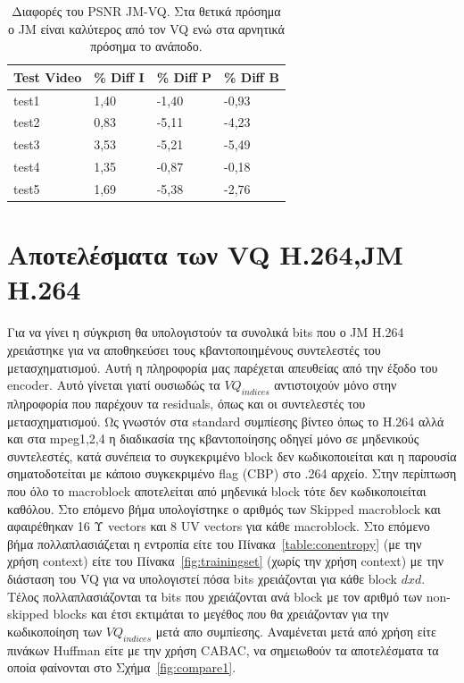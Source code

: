 \begin{table}[h!]
    \begin{center}
        \begin{tabular}{| l | l | l | l |}
        \hline
        Test Video & \% Diff I  & \% Diff P & \% Diff B   \\ \hline
        test1      & 1,40	    & -1,40	    & -0,93       \\ \hline
        test2      & 0,83	    & -5,11	    & -4,23       \\ \hline
        test3      & 3,53	    & -5,21	    & -5,49       \\ \hline
        test4      & 1,35	    & -0,87	    & -0,18       \\ \hline
        test5      & 1,69	    & -5,38	    & -2,76       \\ \hline
        \hline
        \end{tabular}
    \end{center}

    \caption{Διαφορές του PSNR JM-VQ. Στα θετικά πρόσημα ο JM είναι καλύτερος από τον VQ ενώ στα αρνητικά πρόσημα  το ανάποδο.}
    \label{table:jmvqdiff}
\end{table}

\newpage
\section{Αποτελέσματα των VQ H.264,JM H.264}
\label{section:sect63}

\indent Για να γίνει η σύγκριση θα υπολογιστούν τα συνολικά bits που ο JM H.264 χρειάστηκε για να αποθηκεύσει τους κβαντοποιημένους συντελεστές του μετασχηματισμού. Αυτή η πληροφορία μας παρέχεται απευθείας από την έξοδο του encoder. Αυτό γίνεται γιατί ουσιωδώς τα $VQ_{indices}$ αντιστοιχούν μόνο στην πληροφορία που  παρέχουν τα residuals, όπως και οι συντελεστές του μετασχηματισμού. Ως γνωστόν στα standard συμπίεσης βίντεο όπως το H.264 αλλά και στα mpeg1,2,4 η διαδικασία της κβαντοποίησης οδηγεί μόνο σε μηδενικούς συντελεστές, κατά συνέπεια το συγκεκριμένο block δεν κωδικοποιείται και η παρουσία σηματοδοτείται με κάποιο συγκεκριμένο flag (CBP) στο .264 αρχείο. Στην περίπτωση που όλο το macroblock αποτελείται από μηδενικά block τότε δεν κωδικοποιείται καθόλου. Στο επόμενο βήμα υπολογίστηκε ο αριθμός των Skipped macroblock και αφαιρέθηκαν 16 Υ vectors και 8 UV vectors για κάθε macroblock. Στο επόμενο βήμα πολλαπλασιάζεται η εντροπία είτε του Πίνακα~\ref{table:conentropy} (με την χρήση context) είτε του Πίνακα~\ref{fig:trainingset} (χωρίς την χρήση context) με την διάσταση του VQ για να υπολογιστεί πόσα bits χρειάζονται για κάθε block $dxd$. Τέλος πολλαπλασιάζονται τα bits που χρειάζονται ανά block με τον αριθμό των non-skipped blocks και έτσι εκτιμάται το μεγέθος που θα χρειάζονταν για την κωδικοποίηση των $VQ_{indices}$ μετά απο συμπίεσης. Αναμένεται μετά από χρήση είτε πινάκων Huffman είτε με την χρήση CABAC, να σημειωθούν τα αποτελέσματα τα οποία φαίνονται στο Σχήμα~\ref{fig:compare1}.


